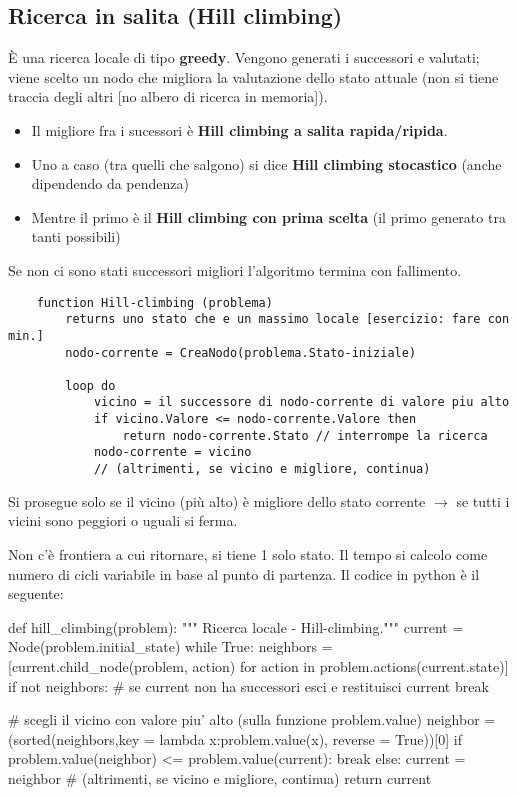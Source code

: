 \subsection{Ricerca in salita (Hill climbing)}
È una ricerca locale di tipo \textbf{greedy}. Vengono generati i successori e valutati; viene scelto un nodo che migliora la valutazione dello stato attuale (non si tiene traccia degli altri [no albero di ricerca in memoria]).
\begin{itemize}
    \item Il migliore fra i sucessori è \textbf{Hill climbing a salita rapida/ripida}.
    \item Uno a caso (tra quelli che salgono) si dice \textbf{Hill climbing stocastico} (anche dipendendo da pendenza)
    \item Mentre il primo è il \textbf{Hill climbing con prima scelta} (il primo generato tra tanti possibili)
\end{itemize}
Se non ci sono stati successori migliori l’algoritmo termina con fallimento.
\begin{lstlisting}
    function Hill-climbing (problema)
        returns uno stato che e un massimo locale [esercizio: fare con min.]
        nodo-corrente = CreaNodo(problema.Stato-iniziale)
        
        loop do   
            vicino = il successore di nodo-corrente di valore piu alto
            if vicino.Valore <= nodo-corrente.Valore then
                return nodo-corrente.Stato // interrompe la ricerca
            nodo-corrente = vicino
            // (altrimenti, se vicino e migliore, continua)
\end{lstlisting}
\begin{note}
    Si prosegue solo se il vicino (più alto) è migliore dello stato corrente $\to$ se tutti i vicini sono peggiori o uguali si ferma.
\end{note}
Non c'è frontiera a cui ritornare, si tiene 1 solo stato. Il tempo si calcolo come numero di cicli variabile in base al punto di partenza.
Il codice in python è il seguente:
\begin{python}
    def hill_climbing(problem): """ Ricerca locale - Hill-climbing."""
        current = Node(problem.initial_state)
        while True:
            neighbors = [current.child_node(problem, action) for action in
                        problem.actions(current.state)]
            if not neighbors: 
                # se current non ha successori esci e restituisci current
                break

            # scegli il vicino con valore piu' alto (sulla funzione problem.value)
            neighbor = (sorted(neighbors,key = lambda x:problem.value(x), reverse = True))[0]
            if problem.value(neighbor) <= problem.value(current):
                break
            else:
                current = neighbor # (altrimenti, se vicino e migliore, continua)
        return current
\end{python}
